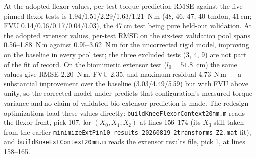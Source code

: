 At the adopted flexor values, per-test torque-prediction RMSE against the five pinned-flexor tests is 1.94/1.51/2.29/1.63/1.21~N{\,m} (48, 46, 47, 40-tendon, 41\,cm; FVU 0.14/0.06/0.17/0.04/0.03), the 47\,cm test being pure held-out validation. At the adopted extensor values, per-test RMSE on the six-test validation pool spans 0.56--1.88~N{\,m} against 0.95--3.62~N{\,m} for the uncorrected rigid model, improving on the baseline in every pool test; the three excluded tests (3, 4, 9) are not part of the fit of record. On the biomimetic extensor test ($l_{0} = 51.8$~cm) the same values give RMSE 2.20~N{\,m}, FVU 2.35, and maximum residual 4.73~N{\,m} --- a substantial improvement over the baseline (3.03/4.49/5.59) but with FVU above unity, so the corrected model under-predicts that configuration's measured torque variance and no claim of validated bio-extensor prediction is made. The redesign optimizations load these values directly: \texttt{buildKneeFlexorContext20mm.m} reads the flexor front, pick 107, for $(X_{0},X_{1},X_{2})$ at lines 156--174 (its $X_{3}$ still taken from the earlier \texttt{minimizeExtPin10\_results\_20260819\_2transforms\_Z2.mat} fit), and \texttt{buildKneeExtContext20mm.m} reads the extensor results file, pick 1, at lines 158--165. 

